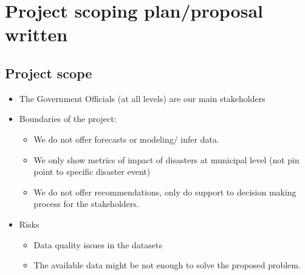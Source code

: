 \documentclass[11pt]{article}
\begin{document}






\section{Project scoping plan/proposal written}
\label{sec:app}

\subsection{Project scope}

\begin{itemize}
\item The Government Officials (at all levels) are our main stakeholders
\item Boundaries of the project:
\begin{itemize}
\item We do not offer forecasts or modeling/ infer data.
\item We only show metrics of impact of disasters at municipal level (not pin point to specific disaster event)
\item We do not offer recommendations, only do support to decision making process for the stakeholders.
\end{itemize}
\item Risks
\begin{itemize}
\item Data quality issues in the datasets 
\item The available data might be not enough to solve the proposed problem.
\end{itemize}
\end{itemize}
\end{document}
